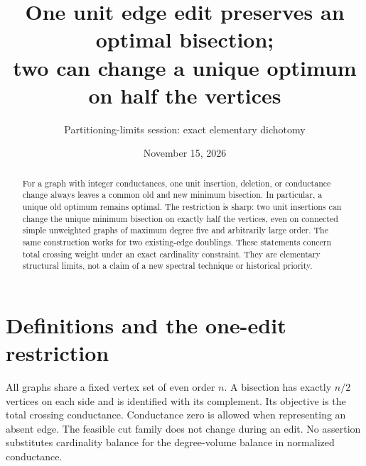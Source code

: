 \documentclass[11pt]{article}
\title{One unit edge edit preserves an optimal bisection;\\
two can change a unique optimum on half the vertices}
\author{Partitioning-limits session: exact elementary dichotomy}
\date{November 15, 2026}
\begin{document}
\maketitle
\begin{abstract}
For a graph with integer conductances, one unit insertion, deletion, or
conductance change always leaves a common old and new minimum bisection.
In particular, a unique old optimum remains optimal. The restriction is
sharp: two unit insertions can change the unique minimum bisection on
exactly half the vertices, even on connected simple unweighted graphs of
maximum degree five and arbitrarily large order. The same construction
works for two existing-edge doublings. These statements concern total
crossing weight under an exact cardinality constraint. They are elementary
structural limits, not a claim of a new spectral technique or historical
priority.
\end{abstract}

\section*{Definitions and the one-edit restriction}
All graphs share a fixed vertex set of even order $n$. A bisection has
exactly $n/2$ vertices on each side and is identified with its complement.
Its objective is the total crossing conductance. Conductance zero is
allowed when representing an absent edge. The feasible cut family does
not change during an edit. No assertion substitutes cardinality balance
for the degree-volume balance in normalized conductance.
\end{document}
